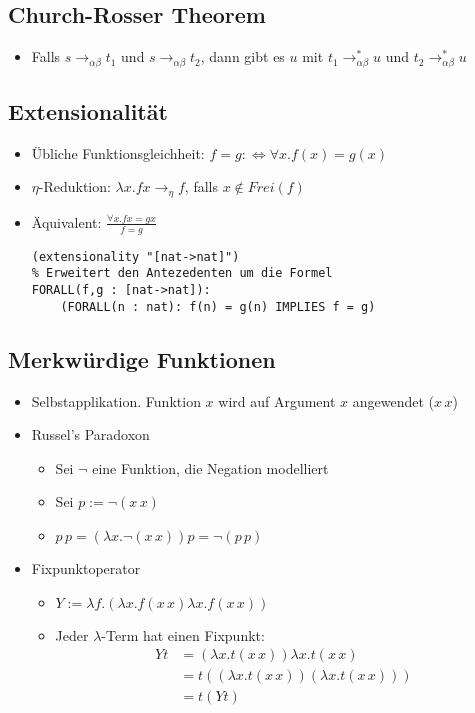 \documentclass{scrartcl}
\begin{document}
\subsection{Church-Rosser Theorem}

\begin{itemize}
	\item Falls $ s \rightarrow_{\alpha \beta} t_1 $ und $ s \rightarrow_{\alpha \beta} t_2 $, dann gibt es $ u $ mit $ t_1 \rightarrow_{\alpha \beta}^* u $ und $ t_2 \rightarrow_{\alpha \beta}^* u $
\end{itemize}

\subsection{Extensionalität}

\begin{itemize}
	\item Übliche Funktionsgleichheit: $ f = g :\iff \forall x.f(x) = g(x) $
	\item $ \eta $-Reduktion: $ \lambda x.fx \rightarrow_\eta f $, falls $ x \not \in Frei(f) $
	\item Äquivalent: $ \frac{\forall x.fx = gx}{f = g} $
	\begin{lstlisting}
(extensionality "[nat->nat]")
% Erweitert den Antezedenten um die Formel
FORALL(f,g : [nat->nat]):
	(FORALL(n : nat): f(n) = g(n) IMPLIES f = g)
	\end{lstlisting}
\end{itemize}

\subsection{Merkwürdige Funktionen}

\begin{itemize}
	\item Selbstapplikation. Funktion $ x $ wird auf Argument $ x $ angewendet ($ x \, x $)
	\item Russel's Paradoxon
	\begin{itemize}
		\item Sei $ \neg $ eine Funktion, die Negation modelliert
		\item Sei $ p := \neg (x \, x) $
		\item $ p \, p = (\lambda x.\neg (x \, x))p = \neg (p \, p) $
	\end{itemize}
	\item Fixpunktoperator
	\begin{itemize}
		\item $ Y := \lambda f.(\lambda x.f(x \, x) \lambda x.f(x \, x)) $
		\item Jeder $ \lambda $-Term hat einen Fixpunkt:
		\begin{align*}
		Y t &= (\lambda x.t(x \, x)) \lambda x.t(x \, x) \\
		&= t((\lambda x.t(x \, x))(\lambda x.t(x \, x))) \\
		&= t(Y t)
		\end{align*}
	\end{itemize}
\end{itemize}
\end{document}

